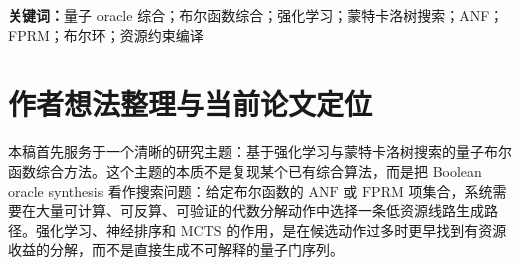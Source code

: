 \documentclass[UTF8,fontset=macnew,11pt]{ctexart}
\newcommand{\method}{Resource-NMCTS}
\newcommand{\anf}{\ensuremath{\mathrm{ANF}}}
\newcommand{\fprm}{\ensuremath{\mathrm{FPRM}}}
\newcommand{\mcts}{\ensuremath{\mathrm{MCTS}}}
\newcommand{\ttable}{truth-table}
\newcommand{\mct}{\ensuremath{\mathrm{MCT}}}
\begin{document}
\begin{abstract}
项集级 $n=20,22,24,28,32,36,40$ scale 实验表明，结构深度策略可以在接近 all-depth adaptive 质量的同时减少约三分之一时间；depth-frontier policy 在 $n=20,28,40$ 上相对 fixed depth-2 获得 35/0/37，平均 score 降低 2.19\%，相对 all-depth depth$\leq4$ 节省 58.69\% 时间。独立 seed 的 $n=24,28,32,40$ 泛化实验中，原 frontier policy 相对 fixed depth-2 为 40/0/56、平均 score 降低 1.85\%；扩大训练集后的 large frontier policy 在同一泛化集上提升到 56/0/40、平均 score 降低 2.34\%，相对旧 policy 为 17/0/79、平均 score 再降 0.49\%，相对 all-depth 仅高 0.10\% 且节省 53.50\% 时间。进一步加入时间感知标签目标 $score_{\Delta}+0.003\,time_{\Delta}$ 后，cost-aware frontier policy 在同一泛化集上仍相对 fixed depth-2 获得 56/0/40、平均 score 降低 1.39\%，但把相对 fixed depth-2 的 plan-time 增幅从 large policy 的 563.80\% 降至 170.03\%；相对 large policy，它以 +0.99\% score 代价换取 33.02\% 时间下降和 7.61\% 辅助线 lifetime area 下降。

所有 6600 个项集级方法行均通过 factor-plan \anf{} 展开验证和 emitted X/CNOT/\mct{} circuit 的 GF(2) 多项式符号模拟验证；进一步的 $n=21,22,23$ bridge、large-policy $n=23$ rerun 和 cost-aware $n=23$ rerun 中，300/300 个方法行同时通过完整 \ttable{} oracle 验证、plan 验证和 emitted-circuit 符号验证。新增 emitted-circuit schedule proxy 显示，large frontier policy 在 $n=23$ 完整 bridge 上相对旧 policy 为 1/0/5，平均 score 再降 0.48\%，T-depth proxy 再降 0.45\%；cost-aware policy 则相对 large policy 以 +0.92\% score 代价换取 56.29\% plan time 下降和 12.62\% lifetime area 下降。本文的阶段性结论是：\method{} 已形成一条独立于 SSHR、以低 T-count 和低加权逻辑资源为目标的 Boolean oracle synthesis 主线；但 RevKit API 结果表明，论文若要投稿为强算法贡献，还需要增加 phase/Rz-aware 口径并处理非 Clifford 旋转综合成本，或者明确限制 bit-flip oracle 目标，并继续补官方 ROS/mockturtle 与后端相关评估。
\end{abstract}

\noindent\textbf{关键词：}量子 oracle 综合；布尔函数综合；强化学习；蒙特卡洛树搜索；ANF；FPRM；布尔环；资源约束编译

\section*{作者想法整理与当前论文定位}

本稿首先服务于一个清晰的研究主题：基于强化学习与蒙特卡洛树搜索的量子布尔函数综合方法。这个主题的本质不是复现某个已有综合算法，而是把 Boolean oracle synthesis 看作搜索问题：给定布尔函数的 \anf{} 或 \fprm{} 项集合，系统需要在大量可计算、可反算、可验证的代数分解动作中选择一条低资源线路生成路径。强化学习、神经排序和 \mcts{} 的作用，是在候选动作过多时更早找到有资源收益的分解，而不是直接生成不可解释的量子门序列。
\end{document}
